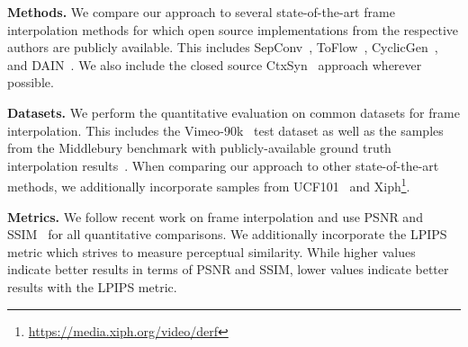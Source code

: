 \documentclass[10pt,twocolumn,letterpaper]{article}
\begin{document}
\vspace{0.05in}
\noindent\textbf{Methods.} We compare our approach to several state-of-the-art frame interpolation methods for which open source implementations from the respective authors are publicly available. This includes SepConv~\cite{Niklaus_ICCV_2017}, ToFlow~\cite{Xue_IJCV_2019}, CyclicGen~\cite{Liu_AAAI_2019}, and DAIN~\cite{Bao_CVPR_2019}. We also include the closed source CtxSyn~\cite{Niklaus_CVPR_2018} approach wherever possible.

\vspace{0.05in}
\noindent\textbf{Datasets.} We perform the quantitative evaluation on common datasets for frame interpolation. This includes the Vimeo-90k~\cite{Xue_IJCV_2019} test dataset as well as the samples from the Middlebury benchmark with publicly-available ground truth interpolation results~\cite{Baker_IJCV_2011}. When comparing our approach to other state-of-the-art methods, we additionally incorporate samples from UCF101~\cite{Liu_ICCV_2017, Soomro_ARXIV_2012} and Xiph\footnote{\url{https://media.xiph.org/video/derf}}.

\vspace{0.05in}
\noindent\textbf{Metrics.} We follow recent work on frame interpolation and use PSNR and SSIM~\cite{Wang_TIP_2004} for all quantitative comparisons. We additionally incorporate the LPIPS~\cite{Rizhang_CVPR_2018} metric which strives to measure perceptual similarity. While higher values indicate better results in terms of PSNR and SSIM, lower values indicate better results with the LPIPS metric.
\end{document}
